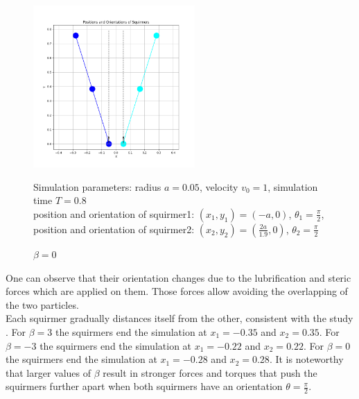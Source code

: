 \documentclass{article}
\begin{document}
\begin{figure}[H]
\begin{minipage}{0.49\textwidth}
        \caption{\footnotesize $\beta = -3$}
    \end{minipage}
    \includegraphics[width=0.55\textwidth]{graphs/simulations/sim_sq_sq/beta0/pi_2_.png}
    \caption{\footnotesize $\beta = 0$}
    Simulation parameters: radius $a=0.05$, velocity $v_0=1$, simulation time $T=0.8$\\
        position and orientation of squirmer1: $(x_1,y_1)=(-a,0)$, $\theta_1=\frac{\pi}{2}$,\\
        position and orientation of squirmer2: $(x_2,y_2)=(\frac{2a}{1.9},0)$, $\theta_2=\frac{\pi}{2}$
 \end{figure}
One can observe that their orientation changes due to the lubrification and steric forces which are applied on them. 
Those forces allow avoiding the overlapping of the two particles.\\
Each squirmer gradually distances itself from the other, consistent with the study \cite{Stark}.
For $\beta = 3$ the squirmers end the simulation at $x_1 = -0.35$ and $x_2 = 0.35$.
For $\beta = -3$ the squirmers end the simulation at $x_1 = -0.22$ and $x_2 = 0.22$.
 For $\beta = 0$ the squirmers end the simulation at $x_1 = -0.28$ and $x_2 = 0.28$.
 It is noteworthy that larger values of $\beta$ result in stronger forces and torques that push the
 squirmers further apart when both squirmers have an orientation $\theta = \frac{\pi}{2}$.
\end{document}
